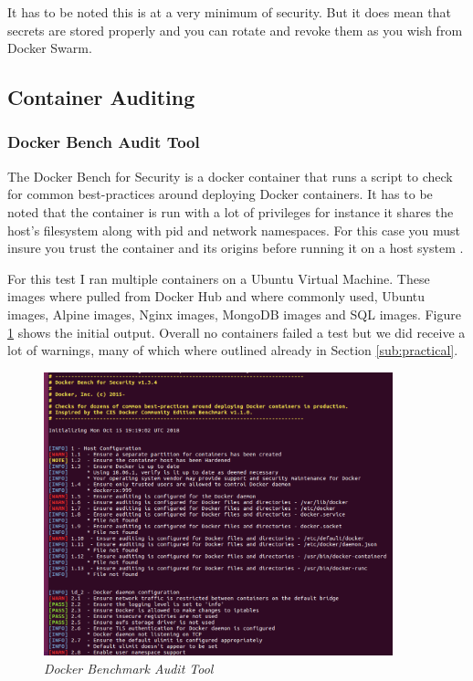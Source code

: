 It has to be noted this is at a very minimum of security. But it does mean that secrets are stored properly and you can rotate and revoke them as you wish from Docker Swarm.
\newpage
\subsection{Container Auditing}
\subsubsection{Docker Bench Audit Tool}
\label{sub:auditDocker}
The Docker Bench for Security is a docker container that runs a script to check for common best-practices around deploying Docker containers. It has to be noted that the container is run with a lot of privileges for instance it shares the host's filesystem along with pid and network namespaces. For this case you must insure you trust the container and its origins before running it on a host system \citep{github_docker_2018}. 

For this test I ran multiple containers on a Ubuntu Virtual Machine. These images where pulled from Docker Hub and where commonly used, Ubuntu images, Alpine images, Nginx images, MongoDB images and SQL images. Figure \ref{img:demo25} shows the initial output. Overall no containers failed a test but we did receive a lot of warnings, many of which where outlined already in Section \ref{sub:practical}.

\begin{figure}[!ht]
\centering
\includegraphics*[width=0.9\textwidth]{images/term25.png}
\caption{\em Docker Benchmark Audit Tool}
\label{img:demo25}
\end{figure}

